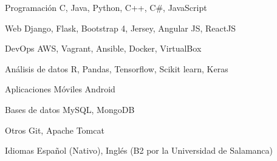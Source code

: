 


\begin{cvskills}


\cvskill
{Programación} %
{C, Java, Python, C++, C\#, JavaScript } %


\cvskill
{Web} %
{Django, Flask, Bootstrap 4, Jersey, Angular JS, ReactJS} %


\cvskill
{DevOps} %
{AWS, Vagrant, Ansible, Docker, VirtualBox} %


\cvskill
{Análisis de datos} %
{R, Pandas, Tensorflow, Scikit learn, Keras} %


\cvskill
{Aplicaciones Móviles} %
{Android} %


\cvskill
{Bases de datos} %
{MySQL, MongoDB} %


\cvskill
{Otros} %
{Git, Apache Tomcat} %


\cvskill
{Idiomas} %
{Español (Nativo), Inglés (B2 por la Universidad de Salamanca)} %


\end{cvskills}